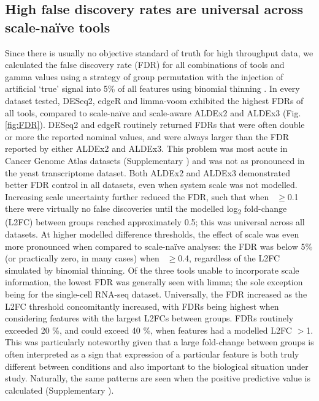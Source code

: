 \documentclass[10pt,letterpaper]{article}
\begin{document}
\subsection*{High false discovery rates are universal across scale-na\"ive tools}
Since there is usually no objective standard of truth for high throughput data, we calculated the false discovery rate (FDR) for all combinations of tools and gamma values using a strategy of group permutation with the injection of artificial `true' signal into 5\% of all features using binomial thinning \cite{gerard_data-based_2020}. In every dataset tested, DESeq2, edgeR and limma-voom exhibited the highest FDRs of all tools, compared to scale-na\"ive and scale-aware ALDEx2 and ALDEx3 (Fig. \ref{fig:FDR}). DESeq2 and edgeR routinely returned FDRs that were often double or more the reported nominal values, and were always larger than the FDR reported by either ALDEx2 and ALDEx3. This problem was most acute in Cancer Genome Atlas datasets (Supplementary ) and was not as pronounced in the yeast transcriptome dataset. Both ALDEx2 and ALDEx3 demonstrated better FDR control in all datasets, even when system scale was not modelled. Increasing scale uncertainty further reduced the FDR, such that when \textgamma~$\geq$0.1 there were virtually no false discoveries until the modelled log\textsubscript{2} fold-change (L2FC) between groups reached approximately 0.5; this was universal across all datasets. At higher modelled difference thresholds, the effect of scale was even more pronounced when compared to scale-na\"ive analyses: the FDR was below 5\% (or practically zero, in many cases) when \textgamma~$\geq$0.4, regardless of the L2FC simulated by binomial thinning. Of the three tools unable to incorporate scale information, the lowest FDR was generally seen with limma; the sole exception being for the single-cell RNA-seq dataset. Universally, the FDR increased as the L2FC threshold concomitantly increased, with FDRs being highest when considering features with the largest L2FCs between groups. FDRs routinely exceeded 20 \%, and could exceed 40 \%, when features had a modelled L2FC $>$1. This was particularly noteworthy given that a large fold-change between groups is often interpreted as a sign that expression of a particular feature is both truly different between conditions and also important to the biological situation under study. Naturally, the same patterns are seen when the positive predictive value is calculated (Supplementary ).
\end{document}
